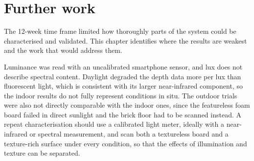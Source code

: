 %
%
%
%
%
%
%

\chapter{Further work}
\label{ch:furtherwork}
The 12-week time frame limited how thoroughly parts of the system could be characterised and validated. This chapter identifies where the results are weakest and the work that would address them.

Luminance was read with an uncalibrated smartphone sensor, and lux does not describe spectral content. Daylight degraded the depth data more per lux than fluorescent light, which is consistent with its larger near-infrared component, so the indoor results do not fully represent conditions in situ. The outdoor trials were also not directly comparable with the indoor ones, since the featureless foam board failed in direct sunlight and the brick floor had to be scanned instead. A repeat characterisation should use a calibrated light meter, ideally with a near-infrared or spectral measurement, and scan both a textureless board and a texture-rich surface under every condition, so that the effects of illumination and texture can be separated.

